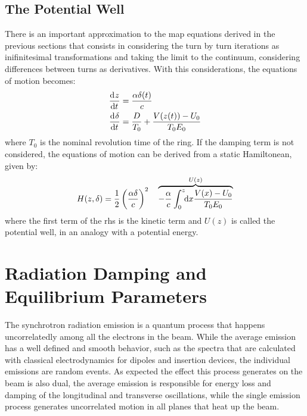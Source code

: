 \documentclass[
	12pt,				%
	openright,			%
	oneside,			%
	a4paper,		%
	chapter=TITLE,		%
	section=TITLE,		%
    brazil,				%
	english,			%
	sumario=tradicional,
	]{abntex2}
\begin{document}
    \subsection{The Potential Well}

	There is an important approximation to the map equations derived in the previous sections that consists in considering the turn by turn iterations as inifinitesimal transformations and taking the limit to the continuum, considering differences between turns as derivatives. With this considerations, the equations of motion becomes:
	\begin{align}
		\dertot{z}{t} &= \frac{\alpha \delta(t)}{c} \\\nonumber
		\dertot{\delta}{t} &= \frac{D}{T_0} + \frac{V(z(t))-U_0}{T_0E_0}
	\end{align}
	where $T_0$ is the nominal revolution time of the ring. If the damping term is not considered, the equations of motion can be derived from a static Hamiltonean, given by:
	\begin{align}
		H(z, \delta) = \frac12\left(\frac{\alpha\delta}{c}\right)^2 \quad \overbrace{- \frac{\alpha}{c}\defint{x}{\frac{V(x)-U_0}{T_0E_0}}{0}{z}}^{U(z)}
	\end{align}
	where the first term of the \gls{rhs} is the kinetic term and $U(z)$ is called the potential well, in an analogy with a potential energy.

  \section{Radiation Damping and Equilibrium Parameters}

  The synchrotron radiation emission is a quantum process that happens uncorrelatedly among all the electrons in the beam. While the average emission has a well defined and smooth behavior, such as the spectra that are calculated with classical electrodynamics for dipoles and insertion devices, the individual emissions are random events. As expected the effect this process generates on the beam is also dual, the average emission is responsible for energy loss and damping of the longitudinal and transverse oscillations, while the single emission process generates uncorrelated motion in all planes that heat up the beam.
\end{document}
